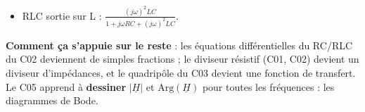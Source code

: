 \begin{recapbox}[title={Récap pour l'examen --- C04 : Impédances}]
\begin{itemize}
        \textbf{Passe-haut} CR : $\frac{j\omega RC}{1+j\omega RC}$,
        $|H| = \frac{\omega RC}{\sqrt{1+(\omega RC)^2}}$, $\varphi = \frac\pi2 - \arctan(\omega RC)$ :
        de 0 à 1, de $\pi/2$ à $0$.
  \item RLC sortie sur L : $\frac{(j\omega)^2LC}{1 + j\omega RC + (j\omega)^2LC}$.
\end{itemize}
\textbf{Comment ça s'appuie sur le reste} : les équations différentielles du RC/RLC du C02
deviennent de simples fractions ; le diviseur résistif (C01, C02) devient un diviseur
d'impédances, et le quadripôle du C03 devient une fonction de transfert. Le C05 apprend à
\textbf{dessiner} $|\underline H|$ et $\mathrm{Arg}(\underline H)$ pour toutes les
fréquences : les diagrammes de Bode.
\end{recapbox}
